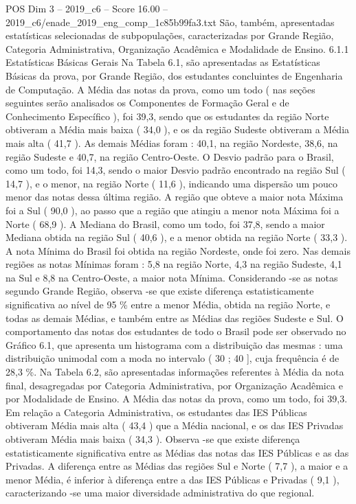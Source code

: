 \begin{textsample}{POS Dim 3 – 2019\_c6 – Score 16.00 – 2019\_c6/enade\_2019\_eng\_comp\_1c85b99fa3.txt}
São, também, apresentadas estatísticas selecionadas de subpopulações, caracterizadas por Grande Região, Categoria Administrativa, Organização Acadêmica e Modalidade de Ensino. 6.1.1 Estatísticas Básicas Gerais Na Tabela 6.1, são apresentadas as Estatísticas Básicas da prova, por Grande Região, dos estudantes concluintes de Engenharia de Computação.
A Média das notas da prova, como um todo ( nas seções seguintes serão analisados os Componentes de Formação Geral e de Conhecimento Específico ), foi 39,3, sendo que os estudantes da região Norte obtiveram a Média mais baixa ( 34,0 ), e os da região Sudeste obtiveram a Média mais alta ( 41,7 ).
As demais Médias foram : 40,1, na região Nordeste, 38,6, na região Sudeste e 40,7, na região Centro-Oeste.
O Desvio padrão para o Brasil, como um todo, foi 14,3, sendo o maior Desvio padrão encontrado na região Sul ( 14,7 ), e o menor, na região Norte ( 11,6 ), indicando uma dispersão um pouco menor das notas dessa última região.
A região que obteve a maior nota Máxima foi a Sul ( 90,0 ), ao passo que a região que atingiu a menor nota Máxima foi a Norte ( 68,9 ).
A Mediana do Brasil, como um todo, foi 37,8, sendo a maior Mediana obtida na região Sul ( 40,6 ), e a menor obtida na região Norte ( 33,3 ).
A nota Mínima do Brasil foi obtida na região Nordeste, onde foi zero.
Nas demais regiões as notas Mínimas foram : 5,8 na região Norte, 4,3 na região Sudeste, 4,1 na Sul e 8,8 na Centro-Oeste, a maior nota Mínima.
Considerando -se as notas segundo Grande Região, observa -se que existe diferença estatisticamente significativa ao nível de 95 \% entre a menor Média, obtida na região Norte, e todas as demais Médias, e também entre as Médias das regiões Sudeste e Sul.
O comportamento das notas dos estudantes de todo o Brasil pode ser observado no Gráfico 6.1, que apresenta um histograma com a distribuição das mesmas : uma distribuição unimodal com a moda no intervalo ( 30 ; 40 ], cuja frequência é de 28,3 \%.
Na Tabela 6.2, são apresentadas informações referentes à Média da nota final, desagregadas por Categoria Administrativa, por Organização Acadêmica e por Modalidade de Ensino.
A Média das notas da prova, como um todo, foi 39,3.
Em relação a Categoria Administrativa, os estudantes das IES Públicas obtiveram Média mais alta ( 43,4 ) que a Média nacional, e os das IES Privadas obtiveram Média mais baixa ( 34,3 ).
Observa -se que existe diferença estatisticamente significativa entre as Médias das notas das IES Públicas e as das Privadas.
A diferença entre as Médias das regiões Sul e Norte ( 7,7 ), a maior e a menor Média, é inferior à diferença entre a das IES Públicas e Privadas ( 9,1 ), caracterizando -se uma maior diversidade administrativa do que regional.

\end{textsample}
